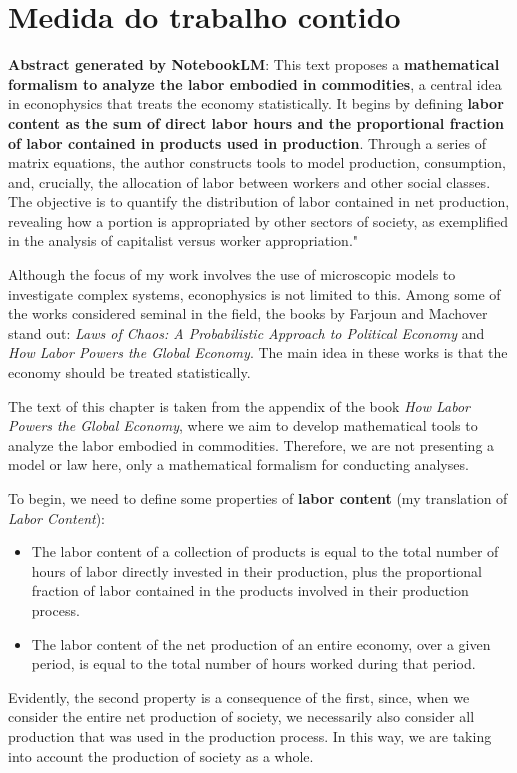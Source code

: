 \newpage
\section{Medida do trabalho contido}

\textbf{Abstract generated by NotebookLM}:  This text proposes a \textbf{mathematical formalism to analyze the labor embodied in commodities}, a central idea in econophysics that treats the economy statistically. It begins by defining \textbf{labor content as the sum of direct labor hours and the proportional fraction of labor contained in products used in production}. Through a series of matrix equations, the author constructs tools to model production, consumption, and, crucially, the allocation of labor between workers and other social classes. The objective is to quantify the distribution of labor contained in net production, revealing how a portion is appropriated by other sectors of society, as exemplified in the analysis of capitalist versus worker appropriation."


Although the focus of my work involves the use of microscopic models to investigate complex systems, econophysics is not limited to this. Among some of the works considered seminal in the field, the books by Farjoun and Machover stand out: \textit{Laws of Chaos: A Probabilistic Approach to Political Economy} and \textit{How Labor Powers the Global Economy}. The main idea in these works is that the economy should be treated statistically.

The text of this chapter is taken from the appendix of the book \textit{How Labor Powers the Global Economy}, where we aim to develop mathematical tools to analyze the labor embodied in commodities. Therefore, we are not presenting a model or law here, only a mathematical formalism for conducting analyses.

To begin, we need to define some properties of \textbf{labor content} (my translation of \textit{Labor Content}):

\begin{itemize}
    \item The labor content of a collection of products is equal to the total number of hours of labor directly invested in their production, plus the proportional fraction of labor contained in the products involved in their production process.
    \item The labor content of the net production of an entire economy, over a given period, is equal to the total number of hours worked during that period.
\end{itemize}
Evidently, the second property is a consequence of the first, since, when we consider the entire net production of society, we necessarily also consider all production that was used in the production process. In this way, we are taking into account the production of society as a whole.


